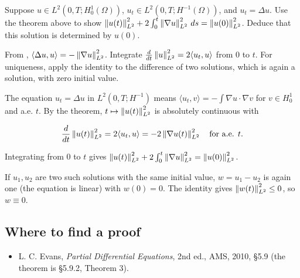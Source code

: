 \begin{exercise}
  Suppose $u \in L^2(0,T;H^1_0(\Omega))$, $u_t \in L^2(0,T;H^{-1}(\Omega))$, and $u_t = \Delta u$. Use the theorem above to show $\left\lVert u(t)\right\rVert_{L^2}^2 + 2\int_0^t \left\lVert \nabla u\right\rVert_{L^2}^2\,ds = \left\lVert u(0)\right\rVert_{L^2}^2$. Deduce that this solution is determined by $u(0)$.
  \begin{hint}
    From , $\langle \Delta u, u\rangle = -\left\lVert \nabla u\right\rVert_{L^2}^2$. Integrate $\frac{d}{dt}\left\lVert u\right\rVert_{L^2}^2 = 2\langle u_t, u\rangle$ from $0$ to $t$. For uniqueness, apply the identity to the difference of two solutions, which is again a solution, with zero initial value.
  \end{hint}
  \begin{solution}
    The equation $u_t = \Delta u$ in $L^2(0,T;H^{-1})$ means $\langle u_t, v\rangle = -\int\nabla u\cdot\nabla v$ for $v \in H^1_0$ and a.e. $t$. By the theorem, $t \mapsto \left\lVert u(t)\right\rVert_{L^2}^2$ is absolutely continuous with

    \[ \frac{d}{dt}\left\lVert u(t)\right\rVert_{L^2}^2 = 2\langle u_t, u\rangle = -2\left\lVert \nabla u(t)\right\rVert_{L^2}^2 \quad\text{for a.e. } t. \]

    Integrating from $0$ to $t$ gives $\left\lVert u(t)\right\rVert_{L^2}^2 + 2\int_0^t\left\lVert \nabla u\right\rVert_{L^2}^2 = \left\lVert u(0)\right\rVert_{L^2}^2$.

    If $u_1, u_2$ are two such solutions with the same initial value, $w = u_1 - u_2$ is again one (the equation is linear) with $w(0) = 0$. The identity gives $\left\lVert w(t)\right\rVert_{L^2}^2 \le 0$, so $w \equiv 0$.
  \end{solution}
\end{exercise}

\subsection*{Where to find a proof}

\begin{itemize}
\item L. C. Evans, \emph{Partial Differential Equations}, 2nd ed., AMS, 2010, §5.9 (the theorem is §5.9.2, Theorem 3).
\end{itemize}

\neededfor

